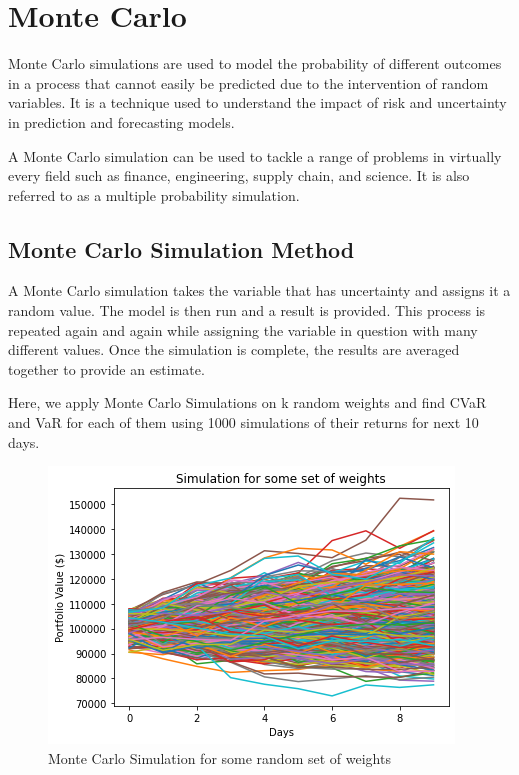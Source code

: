\documentclass[conference]{IEEEtran}
\begin{document}
\section{Monte Carlo}

Monte Carlo simulations are used to model the probability of different outcomes in a process that cannot easily be predicted due to the intervention of random variables. It is a technique used to understand the impact of risk and uncertainty in prediction and forecasting models.

A Monte Carlo simulation can be used to tackle a range of problems in virtually every field such as finance, engineering, supply chain, and science. It is also referred to as a multiple probability simulation.

\subsection{Monte Carlo Simulation Method}
    A Monte Carlo simulation takes the variable that has uncertainty and assigns it a random value. The model is then run and a result is provided. This process is repeated again and again while assigning the variable in question with many different values. Once the simulation is complete, the results are averaged together to provide an estimate.
    
Here, we apply Monte Carlo Simulations on k random weights and find CVaR and VaR for each of them using 1000 simulations of their returns for next 10 days. \

\begin{figure}[htbp]
    \centerline{\includegraphics[scale=0.55]{graphs/simulation01.png}}
    \caption{Monte Carlo Simulation for some random set of weights}
    \label{fig}
\end{figure}
\end{document}
